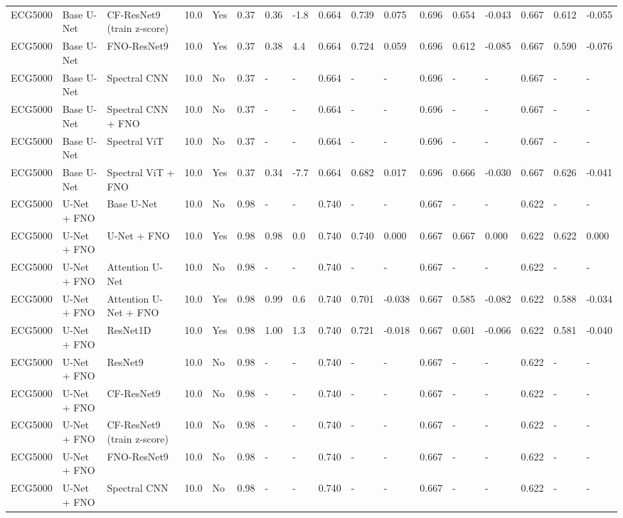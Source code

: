 \begin{longtable}{lllllllllllllllll}
ECG5000 & Base U-Net & CF-ResNet9 (train z-score) & 10.0 & Yes & 0.37 & 0.36 & -1.8 & 0.664 & 0.739 & 0.075 & 0.696 & 0.654 & -0.043 & 0.667 & 0.612 & -0.055 \\
ECG5000 & Base U-Net & FNO-ResNet9 & 10.0 & Yes & 0.37 & 0.38 & 4.4 & 0.664 & 0.724 & 0.059 & 0.696 & 0.612 & -0.085 & 0.667 & 0.590 & -0.076 \\
ECG5000 & Base U-Net & Spectral CNN & 10.0 & No & 0.37 & - & - & 0.664 & - & - & 0.696 & - & - & 0.667 & - & - \\
ECG5000 & Base U-Net & Spectral CNN + FNO & 10.0 & No & 0.37 & - & - & 0.664 & - & - & 0.696 & - & - & 0.667 & - & - \\
ECG5000 & Base U-Net & Spectral ViT & 10.0 & No & 0.37 & - & - & 0.664 & - & - & 0.696 & - & - & 0.667 & - & - \\
ECG5000 & Base U-Net & Spectral ViT + FNO & 10.0 & Yes & 0.37 & 0.34 & -7.7 & 0.664 & 0.682 & 0.017 & 0.696 & 0.666 & -0.030 & 0.667 & 0.626 & -0.041 \\
ECG5000 & U-Net + FNO & Base U-Net & 10.0 & No & 0.98 & - & - & 0.740 & - & - & 0.667 & - & - & 0.622 & - & - \\
ECG5000 & U-Net + FNO & U-Net + FNO & 10.0 & Yes & 0.98 & 0.98 & 0.0 & 0.740 & 0.740 & 0.000 & 0.667 & 0.667 & 0.000 & 0.622 & 0.622 & 0.000 \\
ECG5000 & U-Net + FNO & Attention U-Net & 10.0 & No & 0.98 & - & - & 0.740 & - & - & 0.667 & - & - & 0.622 & - & - \\
ECG5000 & U-Net + FNO & Attention U-Net + FNO & 10.0 & Yes & 0.98 & 0.99 & 0.6 & 0.740 & 0.701 & -0.038 & 0.667 & 0.585 & -0.082 & 0.622 & 0.588 & -0.034 \\
ECG5000 & U-Net + FNO & ResNet1D & 10.0 & Yes & 0.98 & 1.00 & 1.3 & 0.740 & 0.721 & -0.018 & 0.667 & 0.601 & -0.066 & 0.622 & 0.581 & -0.040 \\
ECG5000 & U-Net + FNO & ResNet9 & 10.0 & No & 0.98 & - & - & 0.740 & - & - & 0.667 & - & - & 0.622 & - & - \\
ECG5000 & U-Net + FNO & CF-ResNet9 & 10.0 & No & 0.98 & - & - & 0.740 & - & - & 0.667 & - & - & 0.622 & - & - \\
ECG5000 & U-Net + FNO & CF-ResNet9 (train z-score) & 10.0 & No & 0.98 & - & - & 0.740 & - & - & 0.667 & - & - & 0.622 & - & - \\
ECG5000 & U-Net + FNO & FNO-ResNet9 & 10.0 & No & 0.98 & - & - & 0.740 & - & - & 0.667 & - & - & 0.622 & - & - \\
ECG5000 & U-Net + FNO & Spectral CNN & 10.0 & No & 0.98 & - & - & 0.740 & - & - & 0.667 & - & - & 0.622 & - & - \\

\end{longtable}
